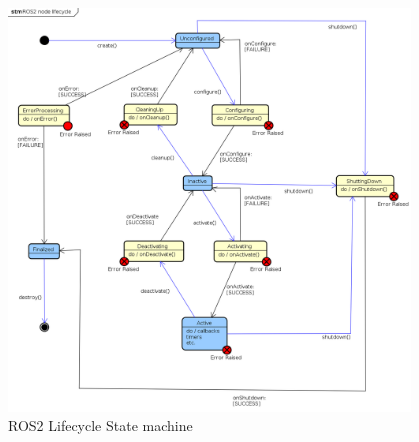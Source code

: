 	\begin{figure}[H]
		\centering
		\includegraphics[width=0.95\textwidth]{"Bilder/ros_lifecycle.png"}
		\caption{ROS2 Lifecycle State machine \cite{ros-2-lifecycle}}
		\label{fig:Background:Ros2LifecycleStateMachine}					
	\end{figure}

